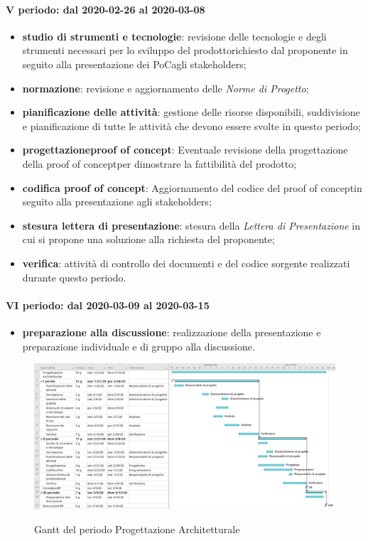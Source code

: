 \paragraph*{V periodo: dal 2020-02-26 al 2020-03-08}
\begin{itemize}
	\item \textbf{studio di strumenti e tecnologie}: revisione delle tecnologie e degli strumenti necessari per lo sviluppo del prodotto\glosp richiesto dal proponente in seguito alla presentazione dei PoC\glosp agli stakeholders\glo;
	\item \textbf{normazione}: revisione e aggiornamento delle \textit{Norme di Progetto};
	\item \textbf{pianificazione delle attività}: gestione delle risorse disponibili, suddivisione e pianificazione di tutte le attività che devono essere svolte in questo periodo;
	\item \textbf{progettazione}\glosp\textbf{proof of concept}\glo: Eventuale revisione della progettazione della proof of concept\glosp per dimostrare la fattibilità del prodotto\glo;
	\item \textbf{codifica proof of concept}\glo: Aggiornamento del codice del proof of concept\glosp in seguito alla presentazione agli stakeholders\glo;
	\item \textbf{stesura lettera di presentazione}: stesura della \textit{Lettera di Presentazione} in cui si propone una soluzione alla richiesta del proponente;
	\item \textbf{verifica}: attività di controllo dei documenti e del codice sorgente realizzati durante questo periodo.
\end{itemize}

\paragraph*{VI periodo: dal 2020-03-09 al 2020-03-15}
\begin{itemize}
	\item \textbf{preparazione alla discussione}: realizzazione della presentazione e preparazione individuale e di gruppo alla discussione.
\end{itemize}

\begin{landscape}
	\begin{figure}[H] 	
		\includegraphics[width=\linewidth]{./gantt/Progettazione_architetturale_datax2.png}	\\
		\caption{Gantt del periodo Progettazione Architetturale}	
	\end{figure}
\end{landscape}


